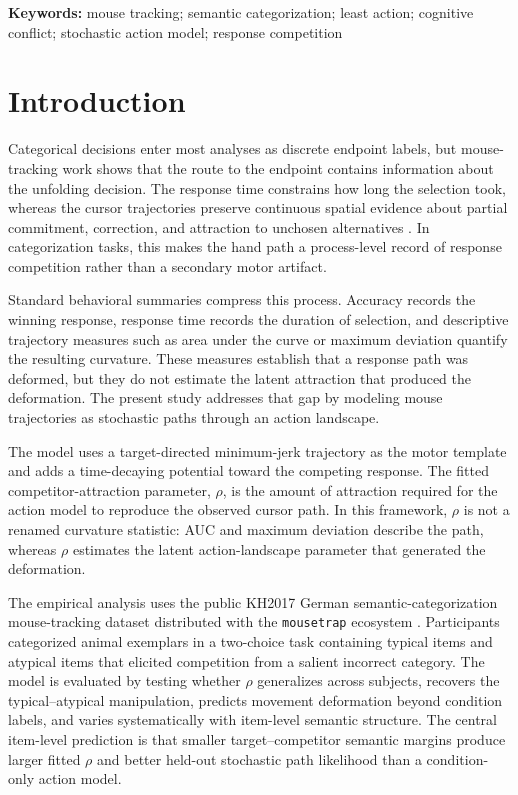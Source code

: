 \documentclass[11pt,final]{article}
\begin{document}
\noindent\textbf{Keywords:} mouse tracking; semantic categorization; least action; cognitive conflict; stochastic action model; response competition

\doublespacing

\section{Introduction}

Categorical decisions enter most analyses as discrete endpoint labels, but mouse-tracking work shows that the route to the endpoint contains information about the unfolding decision. The response time constrains how long the selection took, whereas the cursor trajectories preserve continuous spatial evidence about partial commitment, correction, and attraction to unchosen alternatives \citep{schoemann2021mouse,meyer2024mouse}. In categorization tasks, this makes the hand path a process-level record of response competition rather than a secondary motor artifact.

Standard behavioral summaries compress this process. Accuracy records the winning response, response time records the duration of selection, and descriptive trajectory measures such as area under the curve or maximum deviation quantify the resulting curvature. These measures establish that a response path was deformed, but they do not estimate the latent attraction that produced the deformation. The present study addresses that gap by modeling mouse trajectories as stochastic paths through an action landscape.

The model uses a target-directed minimum-jerk trajectory as the motor template and adds a time-decaying potential toward the competing response. The fitted competitor-attraction parameter, $\rho$, is the amount of attraction required for the action model to reproduce the observed cursor path. In this framework, $\rho$ is not a renamed curvature statistic: AUC and maximum deviation describe the path, whereas $\rho$ estimates the latent action-landscape parameter that generated the deformation.

The empirical analysis uses the public KH2017 German semantic-categorization mouse-tracking dataset distributed with the \texttt{mousetrap} ecosystem \citep{kieslich2017mousetrap,kh2017raw}. Participants categorized animal exemplars in a two-choice task containing typical items and atypical items that elicited competition from a salient incorrect category. The model is evaluated by testing whether $\rho$ generalizes across subjects, recovers the typical--atypical manipulation, predicts movement deformation beyond condition labels, and varies systematically with item-level semantic structure. The central item-level prediction is that smaller target--competitor semantic margins produce larger fitted $\rho$ and better held-out stochastic path likelihood than a condition-only action model.
\end{document}
